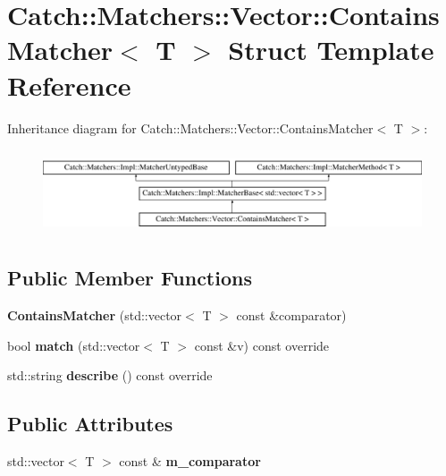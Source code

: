\hypertarget{struct_catch_1_1_matchers_1_1_vector_1_1_contains_matcher}{}\section{Catch\+:\+:Matchers\+:\+:Vector\+:\+:Contains\+Matcher$<$ T $>$ Struct Template Reference}
\label{struct_catch_1_1_matchers_1_1_vector_1_1_contains_matcher}
Inheritance diagram for Catch\+:\+:Matchers\+:\+:Vector\+:\+:Contains\+Matcher$<$ T $>$\+:\begin{figure}[H]
\begin{center}
\leavevmode
\includegraphics[height=2.514970cm]{struct_catch_1_1_matchers_1_1_vector_1_1_contains_matcher}
\end{center}
\end{figure}
\subsection*{Public Member Functions}
\begin{DoxyCompactItemize}
\item 
\mbox{\label{struct_catch_1_1_matchers_1_1_vector_1_1_contains_matcher_ad8e92c8399be6dce75bb5702cdfab700}} 
{\bfseries Contains\+Matcher} (std\+::vector$<$ T $>$ const \&comparator)
\item 
\mbox{\label{struct_catch_1_1_matchers_1_1_vector_1_1_contains_matcher_afd33467ae48a41a634572b41b053f67f}} 
bool {\bfseries match} (std\+::vector$<$ T $>$ const \&v) const override
\item 
\mbox{\label{struct_catch_1_1_matchers_1_1_vector_1_1_contains_matcher_abe6a9ea3d6506c9a1f75ff524f35832e}} 
std\+::string {\bfseries describe} () const override
\end{DoxyCompactItemize}
\subsection*{Public Attributes}
\begin{DoxyCompactItemize}
\item 
\mbox{\label{struct_catch_1_1_matchers_1_1_vector_1_1_contains_matcher_a83d051166e4ed0d535219ad6ee99abb2}} 
std\+::vector$<$ T $>$ const  \& {\bfseries m\+\_\+comparator}
\end{DoxyCompactItemize}
